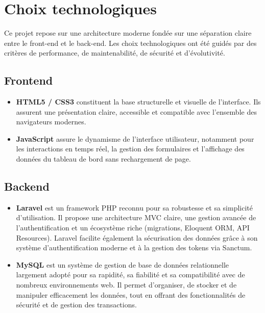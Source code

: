 \section{Choix technologiques}

Ce projet repose sur une architecture moderne fondée sur une séparation 
claire entre le front-end et le back-end. Les choix technologiques ont 
été guidés par des critères de performance, de maintenabilité, de 
sécurité et d'évolutivité.

\subsection{Frontend}

\begin{itemize}
    \item \textbf{HTML5 / CSS3} constituent la base structurelle et 
    visuelle de l'interface. Ils assurent une présentation claire, 
    accessible et compatible avec l'ensemble des navigateurs modernes.

    \item \textbf{JavaScript} assure le dynamisme de l'interface 
    utilisateur, notamment pour les interactions en temps réel, la 
    gestion des formulaires et l'affichage des données du tableau de 
    bord sans rechargement de page.
\end{itemize}

\subsection{Backend}

\begin{itemize}
    \item \textbf{Laravel} est un framework PHP reconnu pour sa 
    robustesse et sa simplicité d'utilisation. Il propose une 
    architecture MVC claire, une gestion avancée de l'authentification 
    et un écosystème riche (migrations, Eloquent ORM, API Resources). 
    Laravel facilite également la sécurisation des données grâce à son 
    système d'authentification moderne et à la gestion des tokens via 
    Sanctum.

    \item \textbf{MySQL} est un système de gestion de base de données 
    relationnelle largement adopté pour sa rapidité, sa fiabilité et sa 
    compatibilité avec de nombreux environnements web. Il permet 
    d'organiser, de stocker et de manipuler efficacement les données, 
    tout en offrant des fonctionnalités de sécurité et de gestion des 
    transactions.
\end{itemize}

